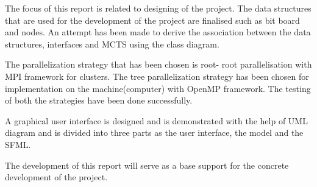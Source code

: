 The focus of this report is related to designing of the project.
The data structures that are used for the development of the project are finalised such as bit board and nodes. An attempt has been made to derive the association between the data structures, interfaces  and MCTS using the class diagram. 

The parallelization strategy that has been chosen is root- root parallelisation with MPI framework for clusters. The tree parallelization strategy has been chosen for implementation on the machine(computer) with  OpenMP framework. The testing of both the strategies have been done successfully.

A graphical user interface is designed and is demonstrated with the help of UML diagram and is divided into three parts as the user interface, the model and the SFML.

The development of this report will serve as a base support for the concrete development of the project.
